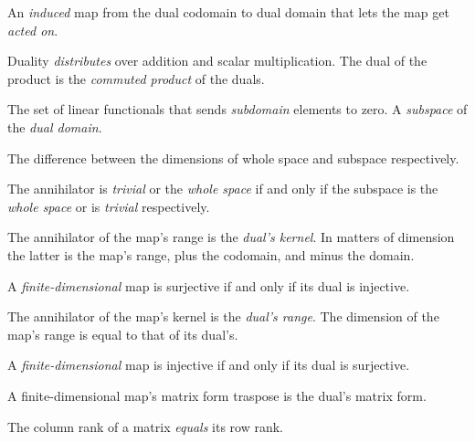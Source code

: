 \begin{multicols}{3}
  An \textit{induced} map from the dual codomain to dual domain
  that lets the map get \textit{acted on}.

  Duality \textit{distributes} over addition and scalar multiplication.
  The dual of the product is the \textit{commuted product} of the duals.

  The set of linear functionals that sends \textit{subdomain} elements to zero.
   A \textit{subspace} of the \textit{dual domain}.

  The difference between the dimensions of whole space and subspace respectively.

  The annihilator is \textit{trivial} or the \textit{whole space} if and only if
  the subspace is the \textit{whole space} or is \textit{trivial} respectively.

  The annihilator of the map's range is the \textit{dual's kernel}.
  In matters of dimension the latter is the map's range, plus
  the codomain, and minus the domain.
  
  A \textit{finite-dimensional} map is surjective if and only if its dual is injective.

  The annihilator of the map's kernel is the \textit{dual's range}.
  The dimension of the map's range is equal to that of its dual's.

  A \textit{finite-dimensional} map is injective if and only if its dual is surjective.

  A finite-dimensional map's matrix form traspose is the dual's matrix form.
  
  The column rank of a matrix \textit{equals} its row rank.

  
  
\end{multicols}


